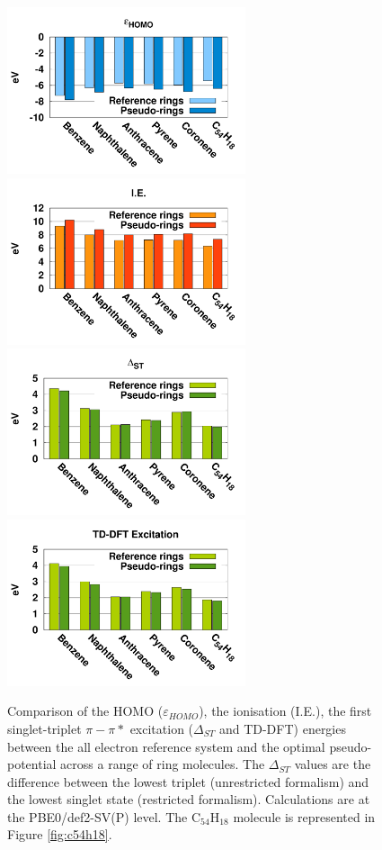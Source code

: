 \documentclass[aip]{revtex4-1}
\begin{document}
\begin{figure}
\begin{center}
\includegraphics[width=7cm]{ring_pbe0_homo}
\includegraphics[width=7cm]{ring_pbe0_ie}
\includegraphics[width=7cm]{ring_pbe0_st}
\includegraphics[width=7cm]{ring_pbe0_tddft}
\end{center}
\caption{Comparison of the HOMO ($\varepsilon_{HOMO}$),
the ionisation (I.E.),
the first singlet-triplet $\pi-\pi*$ excitation ($\Delta_{ST}$ and TD-DFT) energies
between the
all electron reference system and the optimal pseudo-potential across a range of ring molecules.
The $\Delta_{ST}$ values are the difference
between the lowest triplet (unrestricted formalism) and the lowest singlet state
(restricted formalism).
Calculations are at the PBE0/def2-SV(P) level.
The C\(_{54}\)H\(_{18}\) molecule is represented in Figure \ref{fig:c54h18}.}
\label{fig:rings_graphs}
\end{figure}
\end{document}
